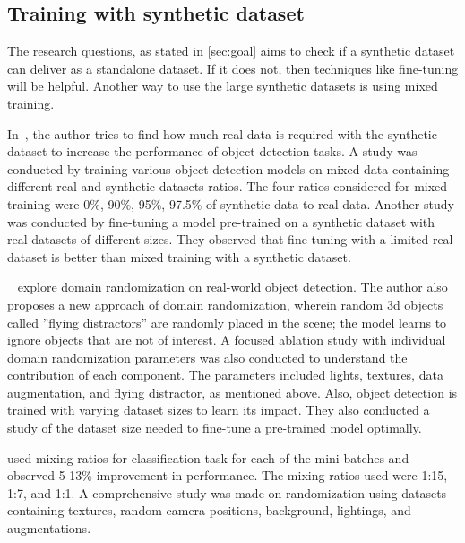 \subsection{Training with synthetic dataset}\label{subsec:training-with-synthetic-dataset}
The research questions, as stated in \autoref{sec:goal} aims to check if a synthetic dataset can deliver as a standalone dataset.
If it does not, then techniques like fine-tuning will be helpful.
Another way to use the large synthetic datasets is using mixed training.

In~\cite{nowruzi2019real},  the author tries to find how much real data is required with the synthetic dataset to increase the performance of object detection tasks.
A study was conducted by training various object detection models on mixed data containing different real and synthetic datasets ratios.
The four ratios considered for mixed training were 0\%, 90\%, 95\%, 97.5\% of synthetic data to real data.
Another study was conducted by fine-tuning a model pre-trained on a synthetic dataset with real datasets of different sizes.
They observed that fine-tuning with a limited real dataset is better than mixed training with a synthetic dataset.

~\cite{Tremblay2018TrainingDN}  explore domain randomization on real-world object detection.
The author also proposes a new approach of domain randomization, wherein random 3d objects called ”flying distractors” are randomly placed in the scene;
the model learns to ignore objects that are not of interest.
A focused ablation study with individual domain randomization parameters was also conducted to understand the contribution of each component.
The parameters included lights, textures, data augmentation, and flying distractor, as mentioned above.
Also, object detection is trained with varying dataset sizes to learn its impact.
They also conducted a study of the dataset size needed to fine-tune a pre-trained model optimally.

\cite{2018LearningIC} used mixing ratios for classification task for each of the mini-batches and observed 5-13\% improvement in performance.
The mixing ratios used were 1:15, 1:7, and 1:1.
A comprehensive study was made on randomization using datasets containing textures, random camera positions, background, lightings, and augmentations.

